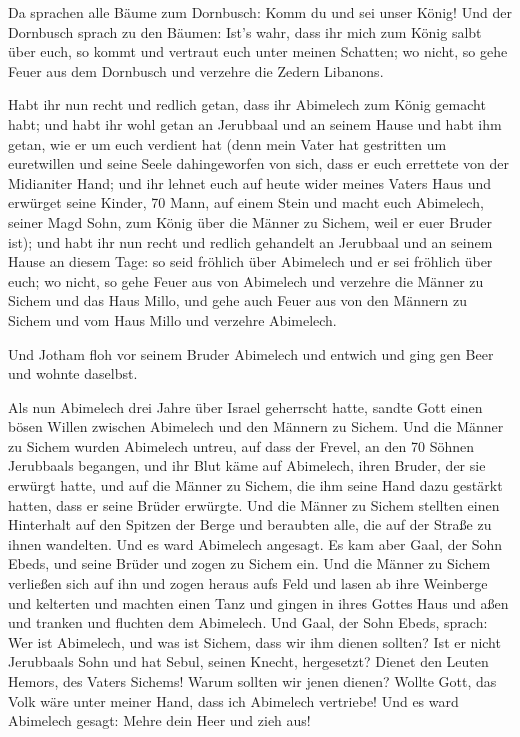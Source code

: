  Da sprachen alle Bäume zum Dornbusch: Komm du und sei
unser König!  Und der Dornbusch sprach zu den Bäumen:
Ist's wahr, dass ihr mich zum König salbt über euch, so kommt und
vertraut euch unter meinen Schatten; wo nicht, so gehe Feuer aus dem
Dornbusch und verzehre die Zedern Libanons.

 Habt ihr nun recht und redlich getan, dass ihr Abimelech
zum König gemacht habt; und habt ihr wohl getan an Jerubbaal und an
seinem Hause und habt ihm getan, wie er um euch verdient hat
 (denn mein Vater hat gestritten um euretwillen und seine
Seele dahingeworfen von sich, dass er euch errettete von der Midianiter
Hand;  und ihr lehnet euch auf heute wider meines Vaters
Haus und erwürget seine Kinder, 70 Mann, auf einem Stein und macht euch
Abimelech, seiner Magd Sohn, zum König über die Männer zu Sichem, weil
er euer Bruder ist);  und habt ihr nun recht und redlich
gehandelt an Jerubbaal und an seinem Hause an diesem Tage: so seid
fröhlich über Abimelech und er sei fröhlich über euch; 
wo nicht, so gehe Feuer aus von Abimelech und verzehre die Männer zu
Sichem und das Haus Millo, und gehe auch Feuer aus von den Männern zu
Sichem und vom Haus Millo und verzehre Abimelech.

 Und Jotham floh vor seinem Bruder Abimelech und entwich
und ging gen Beer und wohnte daselbst.

 Als nun Abimelech drei Jahre über Israel geherrscht
hatte,  sandte Gott einen bösen Willen zwischen Abimelech
und den Männern zu Sichem. Und die Männer zu Sichem wurden Abimelech
untreu,  auf dass der Frevel, an den 70 Söhnen Jerubbaals
begangen, und ihr Blut käme auf Abimelech, ihren Bruder, der sie erwürgt
hatte, und auf die Männer zu Sichem, die ihm seine Hand dazu gestärkt
hatten, dass er seine Brüder erwürgte.  Und die Männer zu
Sichem stellten einen Hinterhalt auf den Spitzen der Berge und beraubten
alle, die auf der Straße zu ihnen wandelten. Und es ward Abimelech
angesagt.  Es kam aber Gaal, der Sohn Ebeds, und seine
Brüder und zogen zu Sichem ein. Und die Männer zu Sichem verließen sich
auf ihn  und zogen heraus aufs Feld und lasen ab ihre
Weinberge und kelterten und machten einen Tanz und gingen in ihres
Gottes Haus und aßen und tranken und fluchten dem Abimelech.
 Und Gaal, der Sohn Ebeds, sprach: Wer ist Abimelech, und
was ist Sichem, dass wir ihm dienen sollten? Ist er nicht Jerubbaals
Sohn und hat Sebul, seinen Knecht, hergesetzt? Dienet den Leuten Hemors,
des Vaters Sichems! Warum sollten wir jenen dienen? 
Wollte Gott, das Volk wäre unter meiner Hand, dass ich Abimelech
vertriebe! Und es ward Abimelech gesagt: Mehre dein Heer und zieh aus!

